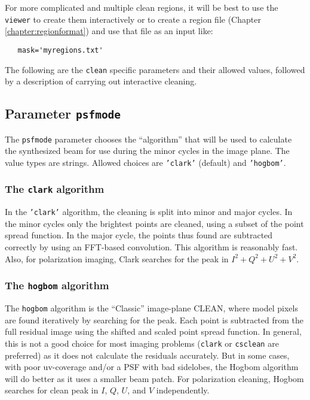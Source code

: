 For more complicated and multiple clean regions, it will be best to
use the {\tt viewer} to create them interactively or to create a region file
(Chapter\,\ref{chapter:regionformat}) and use that file as an input
like:

\begin{verbatim}
   mask='myregions.txt' 
\end{verbatim}
\normalsize

The following are the {\tt clean} specific parameters and their
allowed values, followed by a description of carrying out 
interactive cleaning.

\subsection{Parameter {\tt psfmode}}
\label{section:im.clean.psfmode}

The {\tt psfmode} parameter chooses the ``algorithm'' that will be used
to calculate the synthesized beam for use during the minor cycles in
the image plane. The value types are strings.
Allowed choices are {\tt 'clark'} (default) and {\tt 'hogbom'}. 

\subsubsection{The {\tt clark} algorithm}
\label{section:im.clean.psfmode.clark}

In the {\tt 'clark'} algorithm, the cleaning is split into minor and
major cycles. In the minor cycles only the brightest points are
cleaned, using a subset of the point spread function. In the major
cycle, the points thus found are subtracted correctly by using an
FFT-based convolution.  This algorithm is reasonably fast.
Also, for polarization imaging, Clark searches for the peak in 
$I^2+Q^2+U^2+V^2$.

\subsubsection{The {\tt hogbom} algorithm}
\label{section:im.clean.psfmode.hogbom}

The {\tt hogbom} algorithm is the ``Classic'' image-plane CLEAN, where
model pixels are found iteratively by searching for the peak. Each
point is subtracted from the full residual image using the shifted and
scaled point spread function.  In general, this is not a good choice for most
imaging problems ({\tt clark} or {\tt csclean} are preferred) as it does not
calculate the residuals accurately.  But in some cases, with poor
uv-coverage and/or a PSF with bad sidelobes, the Hogbom algorithm will
do better as it uses a smaller beam patch.  For polarization cleaning,
Hogbom searches for clean peak in $I$, $Q$, $U$, and $V$ independently.

